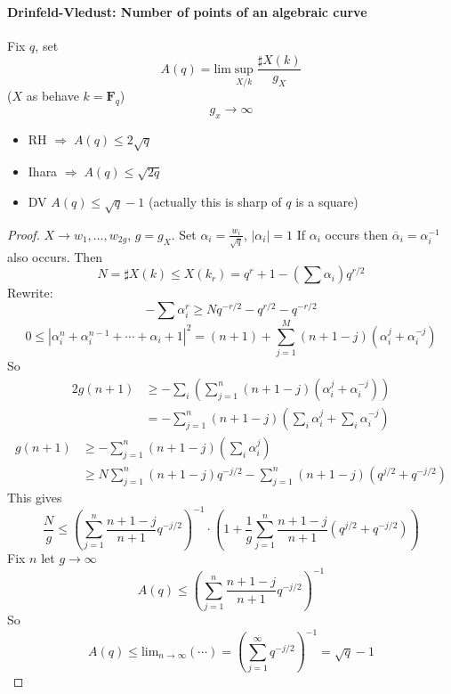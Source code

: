 \paragraph{Drinfeld-Vledust: Number of points of an algebraic curve} Fix $q$, set
	$$A(q) = \text{lim}\sup_{X/k} \frac{\sharp X(k)}{g_X}$$
	($X$ as behave $k=\mathbf{F}_q$)
	$$g_x\to \infty$$
	\begin{itemize}
	\item RH $\Rightarrow\; A(q)\leq 2\sqrt q$
	\item Ihara $\Rightarrow\; A(q)\leq \sqrt{2q}$
	\item DV $A(q)\leq \sqrt q-1$ (actually this is sharp of $q$ is a square)
	\end{itemize}
	
\begin{proof} $X\to w_1, \ldots, w_{2g}$, $g=g_{X}$. Set $\alpha_i=\frac{w_i}{\sqrt q}$, $|\alpha_i|=1$ If $\alpha_i$ occurs then $\overline{\alpha}_i=\alpha_i^{-1}$ also occurs. Then
	$$N=\sharp X(k)\leq X(k_r)=q^r+1-(\sum\alpha_i)q^{r/2}$$
Rewrite:
	$$-\sum\alpha_i^r\geq Nq^{-r/2}-q^{r/2}-q^{-r/2}$$
	$$0\leq |\alpha_i^n +\alpha_i^{n-1} +\cdots +\alpha_i +1|^2 =(n+1)+\sum_{j=1}^M(n+1-j)(\alpha_i^j+\alpha_i^{-j})$$
	So
	\begin{align*}
	2g(n+1) &\geq -\sum_i \left(\sum_{j=1}^n (n+1-j)(\alpha_i^j +\alpha_i^{-j})\right)\\
	&=-\sum_{j=1}^n (n+1-j)\left(\sum_i\alpha_i^j +\sum_i\alpha_i^{-j}\right)
	\end{align*}
	\begin{align*}
	g(n+1)&\geq -\sum_{j=1}^n (n+1-j)(\sum_i\alpha_i^j)\\
	&\geq N\sum_{j=1}^n (n+1-j)q^{-j/2}-\sum_{j=1}^n (n+1-j)(q^{j/2}+q^{-j/2})\end{align*}
	This gives
	$$\frac{N}{g}\leq \left(\sum_{j=1}^n \frac{n+1-j}{n+1}q^{-j/2} \right)^{-1}\cdot\left(1+\frac{1}{g}\sum_{j=1}^n\frac{n+1-j}{n+1}(q^{j/2}+q^{-j/2})\right)$$
	Fix $n$ let $g\to \infty$
	$$A(q)\leq \left(\sum_{j=1}^n \frac{n+1-j}{n+1}q^{-j/2}\right)^{-1}$$
	So 
	$$A(q)\leq \text{lim}_{n\to\infty}(\cdots) = \left(\sum_{j=1}^\infty q^{-j/2}\right)^{-1}=\sqrt q-1$$
\end{proof}







